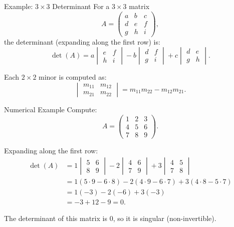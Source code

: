 \documentclass{beamer}
\begin{document}
		\begin{frame}{Example: \(3 \times 3\) Determinant}
		For a \(3 \times 3\) matrix
		\begin{equation}
		A =
		\begin{pmatrix}
		a & b & c \\
		d & e & f \\
		g & h & i
		\end{pmatrix},
		\end{equation}
		the determinant (expanding along the first row) is:
		\begin{equation}
		\det(A) =
		a
		\begin{vmatrix}
		e & f \\ h & i
		\end{vmatrix}
		- b
		\begin{vmatrix}
		d & f \\ g & i
		\end{vmatrix}
		+ c
		\begin{vmatrix}
		d & e \\ g & h
		\end{vmatrix}.
		\end{equation}

		Each \(2 \times 2\) minor is computed as:
		\begin{equation}
		\begin{vmatrix}
		m_{11} & m_{12} \\ m_{21} & m_{22}
		\end{vmatrix} =
		m_{11}m_{22} - m_{12}m_{21}.
		\end{equation}
		\end{frame}


	\begin{frame}{Numerical Example}
	Compute:
		\begin{equation}
		A =
		\begin{pmatrix}
		1 & 2 & 3 \\
		4 & 5 & 6 \\
		7 & 8 & 9
		\end{pmatrix}.
		\end{equation}

	Expanding along the first row:
		\begin{align}
		\det(A) &=
		1
		\begin{vmatrix}
		5 & 6 \\ 8 & 9
		\end{vmatrix}
		- 2
		\begin{vmatrix}
		4 & 6 \\ 7 & 9
		\end{vmatrix}
		+ 3
		\begin{vmatrix}
		4 & 5 \\ 7 & 8
		\end{vmatrix} \\
		&= 1(5\cdot9 -6\cdot8) -2(4\cdot9 -6\cdot7) +3(4\cdot8 -5\cdot7) \\
		&= 1(-3) -2(-6) +3(-3) \\
		&= -3 +12 -9 = 0.
		\end{align}

	The determinant of this matrix is \(0\), so it is singular (non-invertible).
	\end{frame}
\end{document}
